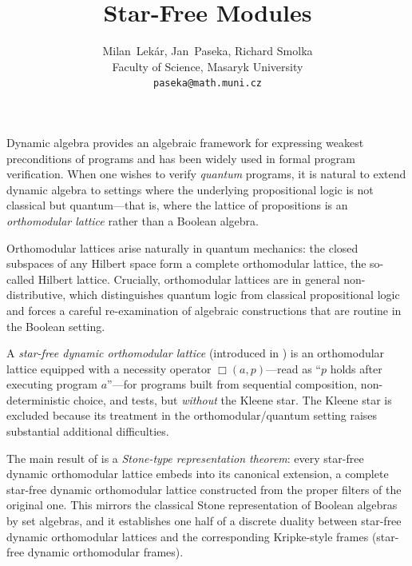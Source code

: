 \documentclass[a4paper]{article} %
\date{} %
\begin{document}
\setcounter{page}{1} %

\title{Star-Free Modules}

\author{Milan~Lekár, Jan~Paseka,  Richard Smolka\\ %
       Faculty of Science, Masaryk University\\
    \texttt{paseka@math.muni.cz} %
       }%

\maketitle




Dynamic algebra provides an algebraic framework for expressing weakest preconditions of programs 
and has been widely used in formal program verification. When one wishes to verify \emph{quantum} 
programs, it is natural to extend dynamic algebra to settings where the underlying propositional 
logic is not classical but quantum---that is, where the lattice of propositions is an 
\emph{orthomodular lattice} rather than a Boolean algebra.

Orthomodular lattices arise naturally in quantum mechanics: the closed subspaces of any Hilbert 
space form a complete orthomodular lattice, the so-called Hilbert lattice. Crucially, 
orthomodular lattices are in general non-distributive, which distinguishes quantum logic from 
classical propositional logic and forces a careful re-examination of algebraic constructions 
that are routine in the Boolean setting.

A \emph{star-free dynamic orthomodular lattice} (introduced in \cite{Takagi}) is an orthomodular 
lattice equipped with a necessity operator $\Box(a, p)$---read as ``$p$ holds after executing 
program $a$''---for programs built from sequential composition, non-deterministic choice, 
and tests, but \emph{without} the Kleene star. The Kleene star is excluded because its treatment 
in the orthomodular/quantum setting raises substantial additional difficulties.

The main result of \cite{Takagi} is a \emph{Stone-type representation theorem}: every star-free 
dynamic orthomodular lattice embeds into its canonical extension, a complete star-free dynamic 
orthomodular lattice constructed from the proper filters of the original one. This mirrors the 
classical Stone representation of Boolean algebras by set algebras, and it establishes one half 
of a discrete duality between star-free dynamic orthomodular lattices and the corresponding 
Kripke-style frames (star-free dynamic orthomodular frames).
\end{document}
